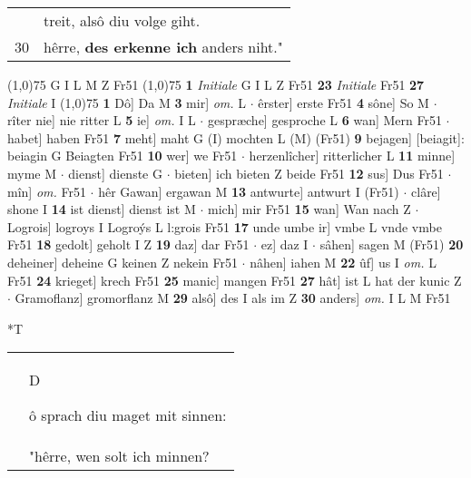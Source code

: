 \documentclass[8pt,a4paper,notitlepage]{article}
\begin{document}
\begin{table}[ht]
\begin{minipage}[t]{0.5\linewidth}
\begin{tabular}{rl}
 & treit, alsô diu volge giht.\\ 
30 & hêrre, \textbf{des erkenne ich} anders niht."\\ 
\end{tabular}
\scriptsize
\line(1,0){75} \newline
G I L M Z Fr51 \newline
\line(1,0){75} \newline
\textbf{1} \textit{Initiale} G I L Z Fr51  \textbf{23} \textit{Initiale} Fr51  \textbf{27} \textit{Initiale} I  \newline
\line(1,0){75} \newline
\textbf{1} Dô] Da M \textbf{3} mir] \textit{om.} L  $\cdot$ êrster] erste Fr51 \textbf{4} sône] So M  $\cdot$ rîter nie] nie ritter L \textbf{5} ie] \textit{om.} I L  $\cdot$ gespræche] gesproche L \textbf{6} wan] Mern Fr51  $\cdot$ habet] haben Fr51 \textbf{7} meht] maht G (I) mochten L (M) (Fr51) \textbf{9} bejagen] [beiagit]: beiagin G Beiagten Fr51 \textbf{10} wer] we Fr51  $\cdot$ herzenlîcher] ritterlicher L \textbf{11} minne] myme M  $\cdot$ dienst] dienste G  $\cdot$ bieten] ich bieten Z beide Fr51 \textbf{12} sus] Dus Fr51  $\cdot$ mîn] \textit{om.} Fr51  $\cdot$ hêr Gawan] ergawan M \textbf{13} antwurte] antwurt I (Fr51)  $\cdot$ clâre] shone I \textbf{14} ist dienst] dienst ist M  $\cdot$ mich] mir Fr51 \textbf{15} wan] Wan nach Z  $\cdot$ Logrois] logroys I Logroýs L l:grois Fr51 \textbf{17} unde umbe ir] vmbe L vnde vmbe Fr51 \textbf{18} gedolt] geholt I Z \textbf{19} daz] dar Fr51  $\cdot$ ez] daz I  $\cdot$ sâhen] sagen M (Fr51) \textbf{20} deheiner] deheine G keinen Z nekein Fr51  $\cdot$ nâhen] iahen M \textbf{22} ûf] us I \textit{om.} L Fr51 \textbf{24} krieget] krech Fr51 \textbf{25} manic] mangen Fr51 \textbf{27} hât] ist L hat der kunic Z  $\cdot$ Gramoflanz] gromorflanz M \textbf{29} alsô] des I als im Z \textbf{30} anders] \textit{om.} I L M Fr51 \newline
\end{minipage}
\hspace{0.5cm}
\begin{minipage}[t]{0.5\linewidth}
\small
\begin{center}*T
\end{center}
\begin{tabular}{rl}
 & \begin{large}D\end{large}ô sprach diu maget mit sinnen:\\ 
 & "hêrre, wen solt ich minnen?\\ 

\end{tabular}
\end{minipage}
\end{table}
\end{document}
